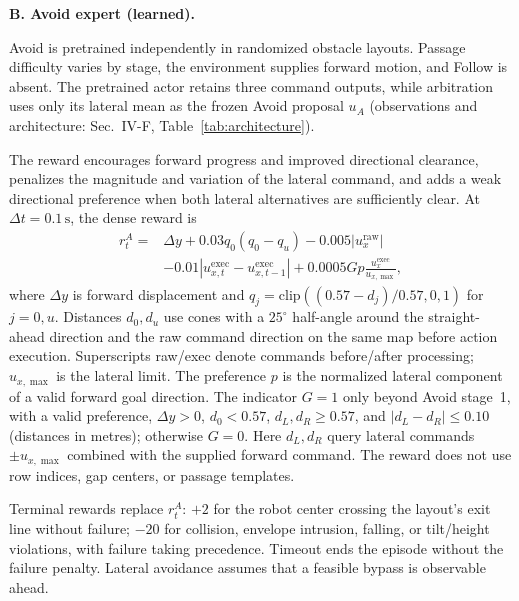 \documentclass[letterpaper, 10 pt, conference]{ieeeconf}
\newcommand{\uA}{u_{A}}
\begin{document}
\textbf{B. Avoid expert (learned).}
{\color{blue}
Avoid is pretrained independently in randomized obstacle layouts. Passage difficulty varies by stage, the environment supplies forward motion, and Follow is absent. The pretrained actor retains three command outputs, while arbitration uses only its lateral mean as the frozen Avoid proposal $\uA$ (observations and architecture: Sec.~IV-F, Table~\ref{tab:architecture}).

The reward encourages forward progress and improved directional clearance, penalizes the magnitude and variation of the lateral command, and adds a weak directional preference when both lateral alternatives are sufficiently clear. At $\Delta t=0.1\,\mathrm{s}$, the dense reward is
\begin{equation}
\begin{aligned}
r_t^A={}&\Delta y+0.03q_0(q_0-q_u)-0.005|u_x^{\mathrm{raw}}|\\
&-0.01|u_{x,t}^{\mathrm{exec}}-u_{x,t-1}^{\mathrm{exec}}|
+0.0005Gp\tfrac{u_x^{\mathrm{exec}}}{u_{x,\max}},
\end{aligned}
\label{eq:avoid_reward}
\end{equation}
where $\Delta y$ is forward displacement and $q_j=\mathrm{clip}((0.57-d_j)/0.57,0,1)$ for $j=0,u$. Distances $d_0,d_u$ use cones with a $25^\circ$ half-angle around the straight-ahead direction and the raw command direction on the same map before action execution. Superscripts raw/exec denote commands before/after processing; $u_{x,\max}$ is the lateral limit. The preference $p$ is the normalized lateral component of a valid forward goal direction. The indicator $G=1$ only beyond Avoid stage~1, with a valid preference, $\Delta y>0$, $d_0<0.57$, $d_L,d_R\ge0.57$, and $|d_L-d_R|\le0.10$ (distances in metres); otherwise $G=0$. Here $d_L,d_R$ query lateral commands $\pm u_{x,\max}$ combined with the supplied forward command. The reward does not use row indices, gap centers, or passage templates.

Terminal rewards replace $r_t^A$: $+2$ for the robot center crossing the layout's exit line without failure; $-20$ for collision, envelope intrusion, falling, or tilt/height violations, with failure taking precedence. Timeout ends the episode without the failure penalty. Lateral avoidance assumes that a feasible bypass is observable ahead.
\par}
\end{document}
